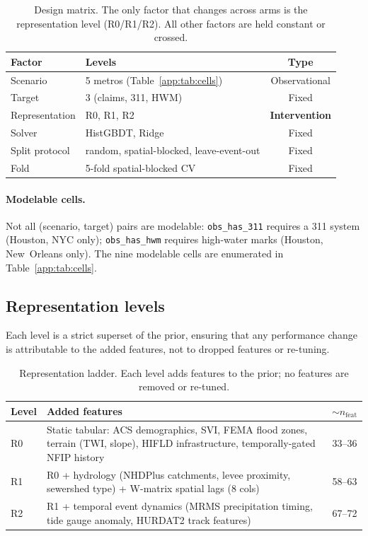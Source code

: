 \begin{table}[t]
\centering
\caption{Design matrix. The only factor that changes across arms is the
  representation level (R0/R1/R2). All other factors are held constant
  or crossed.}
\label{app:tab:design-matrix}
\small
\begin{tabular}{@{}llc@{}}
\toprule
\textbf{Factor} & \textbf{Levels} & \textbf{Type} \\
\midrule
Scenario        & 5 metros (Table~\ref{app:tab:cells}) & Observational \\
Target          & 3 (claims, 311, HWM)                  & Fixed \\
Representation  & R0, R1, R2                            & \textbf{Intervention} \\
Solver          & HistGBDT, Ridge                       & Fixed \\
Split protocol  & random, spatial-blocked, leave-event-out & Fixed \\
Fold            & 5-fold spatial-blocked CV             & Fixed \\
\bottomrule
\end{tabular}
\end{table}

\paragraph{Modelable cells.}
Not all (scenario, target) pairs are modelable: \texttt{obs\_has\_311}
requires a 311 system (Houston, NYC only); \texttt{obs\_has\_hwm}
requires high-water marks (Houston, New~Orleans only). The nine modelable
cells are enumerated in Table~\ref{app:tab:cells}.

\subsection{Representation levels}
\label{app:doe-repr}

Each level is a strict superset of the prior, ensuring that any
performance change is attributable to the added features, not to
dropped features or re-tuning.

\begin{table}[t]
\centering
\caption{Representation ladder. Each level adds features to the prior;
  no features are removed or re-tuned.}
\label{app:tab:repr-levels}
\small
\begin{tabular}{@{}lp{4.5cm}c@{}}
\toprule
\textbf{Level} & \textbf{Added features} & \textbf{$\sim n_\text{feat}$} \\
\midrule
R0 & Static tabular: ACS demographics, SVI, FEMA flood zones,
     terrain (TWI, slope), HIFLD infrastructure,
     temporally-gated NFIP history & 33--36 \\
R1 & R0 + hydrology (NHDPlus catchments, levee proximity,
     sewershed type) + W-matrix spatial lags (8 cols) & 58--63 \\
R2 & R1 + temporal event dynamics (MRMS precipitation timing,
     tide gauge anomaly, HURDAT2 track features) & 67--72 \\
\bottomrule
\end{tabular}
\end{table}

